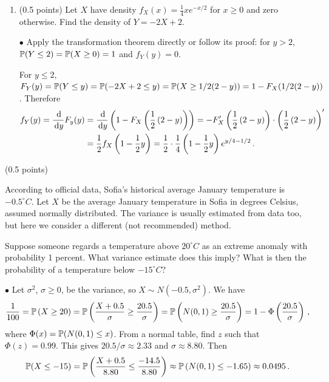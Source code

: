 \documentclass[a4paper]{report}
\begin{document}
\begin{problem}
\begin{enumerate}
\item (0.5 points) Let $X$ have density $f_X(x)=\frac14xe^{-x/2}$ for $x\geq0$ and
zero otherwise. Find the density of $Y=-2X+2$.

$\bullet$ Apply the transformation theorem directly or follow its proof:
for $y>2$, $\P(Y\leq2)=\P(X\geq0)=1$ and $f_Y(y)=0$.

For $y\leq2$,
$F_Y(y)  = \P(Y \leq y) = \P(-2X + 2 \leq y) = \P( X \geq 1/2(2 - y)) = 1 - F_X( 1/2(2 - y))$.
Therefore \begin{align*}
f_Y(y) = \frac {\d}{\d y}F_y(y) &= \frac {\d}{\d y}\left(1 - F_X\left( \frac12\left(2 - y\right)
\right)\right)
= -F_X'\left( \frac12\left(2 - y\right)\right) \cdot \left( \frac12\left(2 - y\right)\right) '
\\
&= \frac12 f_X\left(1 - \frac12 y\right) = \frac12 \cdot \frac14 \left(1- \frac12y\right)e^{y/4 - 1/2} \, .
\end{align*}
    \end{enumerate}
\end{problem}


\begin{problem}(0.5 points)

According to official data, Sofia's historical average January temperature is $-0.5^\circ C$. Let $X$ be the average January temperature in Sofia in degrees Celsius, assumed normally distributed. The variance is usually estimated
from data too, but here we consider a different (not recommended) method.

Suppose someone regards a temperature above $20^\circ C$ as an extreme anomaly
with probability 1 percent. What variance estimate does this imply? What
is then the probability of a temperature below $-15^\circ C$?

$\bullet$
Let $\sigma^2$, $\sigma\geq0$, be the variance, so $X\sim N(-0.5,\sigma^2)$. We have
\[\frac{1}{100} = \P\left(X \geq 20\right) = \P\left( \frac{X + 0.5}{\sigma} \geq \frac{20.5}{\sigma}\right)
= \P\left(N(0,1) \geq \frac{20.5}{\sigma}\right) = 1 - \Phi\left(\frac{20.5}{\sigma}\right) \, ,
\]
where $\Phi(x)=\P(N(0,1)\leq x)$. From a normal table, find $z$
such
that $\Phi(z)=0.99$. This gives $20.5/\sigma\approx2.33$ and
$\sigma\approx8.80$. Then
\[
\P(X \leq -15) =\P\left( \frac{X + 0.5}{8.80} \leq \frac{-14.5}{8.80}\right)
\approx \P\left(N(0,1) \leq -1.65\right) \approx 0.0495 \, .
\]

\end{problem}
\end{document}
